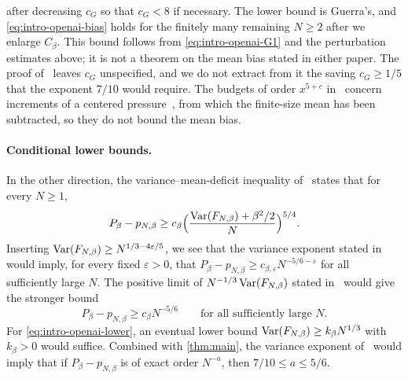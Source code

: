 after decreasing $c_G$ so that $c_G<8$ if necessary. The lower bound is
Guerra's, and \eqref{eq:intro-openai-bias} holds for the finitely many
remaining $N\ge2$ after we enlarge $C_\beta$. This bound follows from
\eqref{eq:intro-openai-G1} and the perturbation estimates above; it is
not a theorem on the mean bias stated in either paper. The proof
of~\cite[Proposition~6.1]{OpenAILimitingLaw} leaves $c_G$ unspecified,
and we do not extract from it the saving $c_G\ge1/5$ that the exponent
$7/10$ would require. The budgets of order $x^{5+c}$
in~\cite[Proposition~4.1]{OpenAILimitingLaw} concern increments of a
centered pressure~\cite[(A4)]{OpenAILimitingLaw}, from which the
finite-size mean has been subtracted, so they do not bound the mean
bias.

\paragraph{Conditional lower bounds.}
In the other direction, the variance--mean-deficit inequality
of~\cite[Lemma~7.4 and Remark~7.14, (7.68)]{AL} states that for every
$N\ge1$,
\[
 P_\beta-p_{N,\beta}\ge c_\beta
 \Bigl(\frac{\operatorname{Var}(F_{N,\beta})+\beta^2/2}{N}\Bigr)^{5/4}.
\]
Inserting $\operatorname{Var}(F_{N,\beta})\ge N^{1/3-4\varepsilon/5}$, we see that the
variance exponent stated in~\cite[Theorem~1.1]{OpenAIFluctuationScale}
would imply, for every fixed $\varepsilon>0$, that
$P_\beta-p_{N,\beta}\ge c_{\beta,\varepsilon}N^{-5/6-\varepsilon}$ for
all sufficiently large $N$. The positive limit of
$N^{-1/3}\operatorname{Var}(F_{N,\beta})$ stated
in~\cite[Theorem~1.2]{OpenAILimitingLaw} would give the stronger bound
\begin{equation}\label{eq:intro-openai-lower}
 P_\beta-p_{N,\beta}\ge c_\beta N^{-5/6}
 \qquad\text{for all sufficiently large }N.
\end{equation}
For \eqref{eq:intro-openai-lower}, an eventual lower bound
$\operatorname{Var}(F_{N,\beta})\ge k_\beta N^{1/3}$ with $k_\beta>0$ would suffice.
Combined with \cref{thm:main}, the variance exponent
of~\cite{OpenAIFluctuationScale} would imply that if
$P_\beta-p_{N,\beta}$ is of exact order $N^{-a}$, then $7/10\le a\le5/6$.

